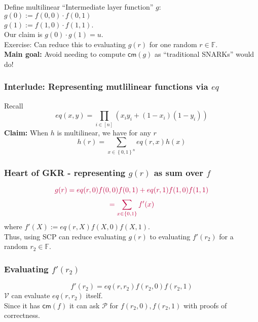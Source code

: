 \documentclass[shadesubsections,compress,14pt,mathserif]{beamer}
\newcommand{\F}{\ensuremath{{\mathbb F}}}
\newcommand{\set}[1]{\ensuremath{\left\{#1\right\}}}
\newcommand{\bin}{\ensuremath{\set{0,1}}}
\newcommand{\cube}{\ensuremath{\bin^n}}
\newcommand{\cm}{\ensuremath{\mathsf{cm}}}
\newcommand{\defeq}{\ensuremath{:=}}
\newcommand{\ver}{\ensuremath{\mathcal{V}}}
\newcommand{\prv}{\ensuremath{\mathcal{P}}}
\newcommand{\nl}{\\ \pause \vspace{0.2in}}
\newcommand{\nlnp}{\\ \vspace{0.2in}}
\begin{document}
\begin{frame}
 Define multilinear  ``Intermediate layer function'' $g$:\\
 $g(0)\defeq f(0,0)\cdot f(0,1)$\\
 $g(1)\defeq f(1,0)\cdot f(1,1)$.\nl
 Our claim is $g(0)\cdot g(1)=u$.\nl
Exercise: Can reduce this to evaluating $g(r)$ for one random $r\in \F$.\nl
\textbf{Main goal:} Avoid needing to compute  $\cm(g)$ as ``traditional SNARKs'' would do!
\end{frame}
\begin{frame}
 \frametitle{Interlude: Representing mutlilinear functions via $eq$}
 Recall
 \[eq(x,y)=\prod_{i\in [n]} (x_i y_i +(1-x_i)(1-y_i))\]\pause
\textbf{Claim:} When $h$ is multilinear, we have for any $r$
\[h(r)=\sum_{x\in \cube} eq(r,x)h(x)\]
\end{frame}

\begin{frame}
 \frametitle{Heart of GKR - representing $g(r)$ as sum over $f$}
 \[\color{purple}{g(r)=eq(r,0) f(0,0)f(0,1) +eq(r,1)f(1,0)f(1,1)}\]\pause
 \[\color{purple}=\sum_{x\in \bin} f'(x)\]
 where $f'(X)\defeq eq(r,X)f(X,0)f(X,1)$.\nl
 Thus, using SCP can reduce evaluating $g(r)$ to evaluating $f'(r_2)$ for a random $r_2\in \F$.
\end{frame}

\begin{frame}
 \frametitle{Evaluating $f'(r_2)$}
 \[f'(r_2)=eq(r,r_2) f(r_2,0) f(r_2,1)\]
 $\ver$ can evaluate $eq(r,r_2)$ itself.\nlnp
 Since it has $\cm(f)$ it can ask $\prv$ for $f(r_2,0),f(r_2,1)$ with proofs of correctness.
\end{frame}

 
\end{document}
